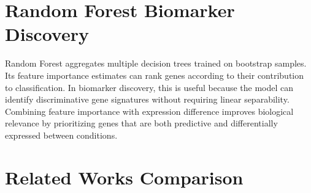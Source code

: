 \section{Random Forest Biomarker Discovery}
Random Forest aggregates multiple decision trees trained on bootstrap samples. Its feature importance estimates can rank genes according to their contribution to classification. In biomarker discovery, this is useful because the model can identify discriminative gene signatures without requiring linear separability. Combining feature importance with expression difference improves biological relevance by prioritizing genes that are both predictive and differentially expressed between conditions.

\section{Related Works Comparison}

